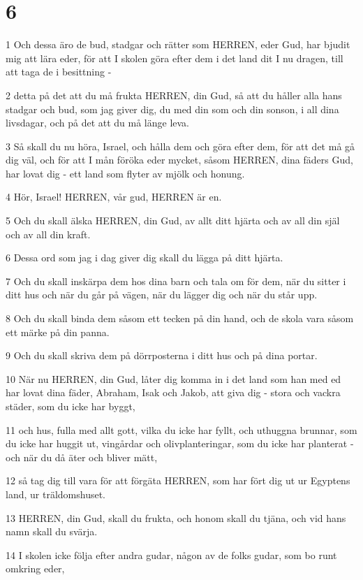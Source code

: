 \chapter{6}

\par 1 Och dessa äro de bud, stadgar och rätter som HERREN, eder Gud, har bjudit mig att lära eder, för att I skolen göra efter dem i det land dit I nu dragen, till att taga de i besittning -
\par 2 detta på det att du må frukta HERREN, din Gud, så att du håller alla hans stadgar och bud, som jag giver dig, du med din som och din sonson, i all dina livsdagar, och på det att du må länge leva.
\par 3 Så skall du nu höra, Israel, och hålla dem och göra efter dem, för att det må gå dig väl, och för att I mån föröka eder mycket, såsom HERREN, dina fäders Gud, har lovat dig - ett land som flyter av mjölk och honung.
\par 4 Hör, Israel! HERREN, vår gud, HERREN är en.
\par 5 Och du skall älska HERREN, din Gud, av allt ditt hjärta och av all din själ och av all din kraft.
\par 6 Dessa ord som jag i dag giver dig skall du lägga på ditt hjärta.
\par 7 Och du skall inskärpa dem hos dina barn och tala om för dem, när du sitter i ditt hus och när du går på vägen, när du lägger dig och när du står upp.
\par 8 Och du skall binda dem såsom ett tecken på din hand, och de skola vara såsom ett märke på din panna.
\par 9 Och du skall skriva dem på dörrposterna i ditt hus och på dina portar.
\par 10 När nu HERREN, din Gud, låter dig komma in i det land som han med ed har lovat dina fäder, Abraham, Isak och Jakob, att giva dig - stora och vackra städer, som du icke har byggt,
\par 11 och hus, fulla med allt gott, vilka du icke har fyllt, och uthuggna brunnar, som du icke har huggit ut, vingårdar och olivplanteringar, som du icke har planterat - och när du då äter och bliver mätt,
\par 12 så tag dig till vara för att förgäta HERREN, som har fört dig ut ur Egyptens land, ur träldomshuset.
\par 13 HERREN, din Gud, skall du frukta, och honom skall du tjäna, och vid hans namn skall du svärja.
\par 14 I skolen icke följa efter andra gudar, någon av de folks gudar, som bo runt omkring eder,

